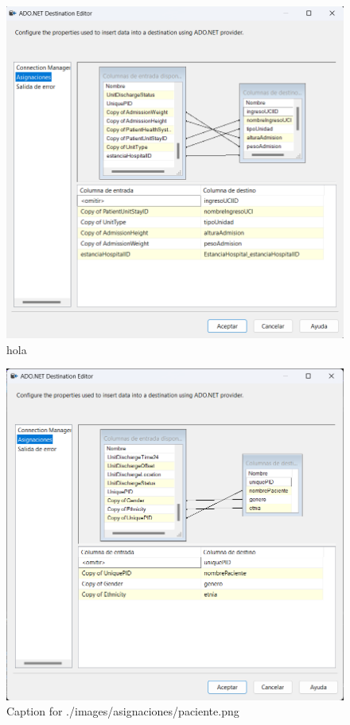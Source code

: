 \documentclass{article}
\begin{document}
\begin{figure}[H]
  \centering
  \includegraphics[width=\linewidth]{./images/asignaciones/ingreso_uci.png}
  \caption{hola}
\end{figure}
\begin{figure}[H]
  \centering
  \includegraphics[width=\linewidth]{./images/asignaciones/paciente.png}
  \caption{Caption for ./images/asignaciones/paciente.png}
\end{figure}
\end{document}
